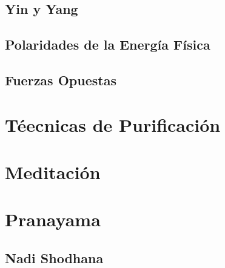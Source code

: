 \subsection{Yin y Yang}
\subsection{Polaridades de la Energía Física}
\subsection{Fuerzas Opuestas}
\section{Téecnicas de Purificación}
\section{Meditación}
\section{Pranayama}
\subsection{Nadi Shodhana}
